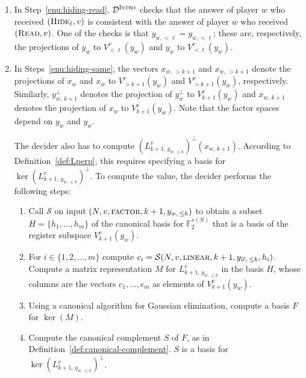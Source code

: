 \documentclass[11pt]{article}
\theoremstyle{definition}
\newcommand{\F}{\ensuremath{\mathbb{F}}}
\newcommand{\sampler}{\mathcal{S}}
\newcommand{\decider}{\mathcal{D}}
\newcommand{\gamestyle}[1]{\ensuremath{\textsc{#1}}\xspace}
\newcommand{\intro}{\gamestyle{Intro}}
\newcommand{\trole}{\ensuremath{v}} %
\newcommand{\typestyle}[1]{\ensuremath{\textsc{#1}}\xspace}
\newcommand{\Read}{\typestyle{Read}}
\newcommand{\Hide}[1]{\typestyle{Hide}_{#1}}
\begin{document}
\begin{enumerate}
\item In Step~\ref{enu:hiding-read}, $\decider^\intro$ checks that the answer of
  player $w$ who received $(\Hide{\ell},\trole)$ is consistent with the answer
  of player $\overline{w}$ who received $(\Read,\trole)$. One of the checks is
  that $y_{w,< \ell} = y_{\overline{w},<\ell}$\;; these are, respectively, the
  projections of $y_w$ to $V^\trole_{< \ell}(y_w)$ and $y_{\overline{w}}$ to
  $V^\trole_{< \ell}(y_{\overline{w}})$.

\item\label{enu:decider-perp}
  \def\Lfunc{L^{\trole}_{k+1,\, y_{\overline{w},\, \le k}}}

  In Steps~\ref{enu:hiding-same}, the vectors $x_{w,\, >k+1}$ and
  $x_{\overline{w},\, >k+1}$ denote the projections of $x_w$ and
  $x_{\overline{w}}$ to $V^\trole_{> k+1}(y_w)$ and $V^\trole_{>
    k+1}(y_{\overline{w}})$, respectively.
  Similarly, $y_{\overline{w},\, k+1}^\perp$ denotes the projection of
  $y_{\overline{w}}^\perp$ to $V^\trole_{k+1} (y_{\overline{w}})$ and
  $x_{w,\, k+1}$ denotes the projection of $x_{w}$ to
  $V^\trole_{k+1}(y_{\overline{w}})$.
  Note that the factor spaces depend on $y_w$ and $y_{\overline{w}}$.

  The decider also has to compute $( \Lfunc )^\perp (x_{w,\, k+1})$.
  According to Definition~\ref{def:Lperp}, this requires specifying a basis for
  $\ker( \Lfunc )^\perp$.
  To compute the value, the decider performs the following steps:
	\begin{enumerate}
  \item Call $\sampler$ on input $(N, \trole, \gamestyle{factor}, k+1, y_{w,\, \le k})$ to
    obtain a subset $H = \{h_1,\ldots,h_m\}$ of the canonical basis for
    $\F_2^{s(N)}$ that is a basis of the register subspace $V^\trole_{k+1}(y_{\overline{w}})$.
  \item For $i \in \{1, 2, \ldots, m\}$ compute $c_i = \sampler(N, \trole,
    \gamestyle{linear}, k+1, y_{\overline{w},\, \le k}, h_i)$.
    Compute a matrix representation $M$ for $ \Lfunc $ in the basis
    $H$, whose columns are the vectors $c_1, \ldots, c_m$ as elements of
    $V^\trole_{k+1}(y_{\overline{w}})$.

  \item Using a canonical algorithm for Gaussian elimination, compute a basis
    $F$ for $\ker(M)$.

  \item Compute the canonical complement $S$ of $F$, as in
    Definition~\ref{def:canonical-complement}.
    $S$ is a basis for $\ker( \Lfunc )^\perp$.


\end{enumerate}
\end{enumerate}
\end{document}
